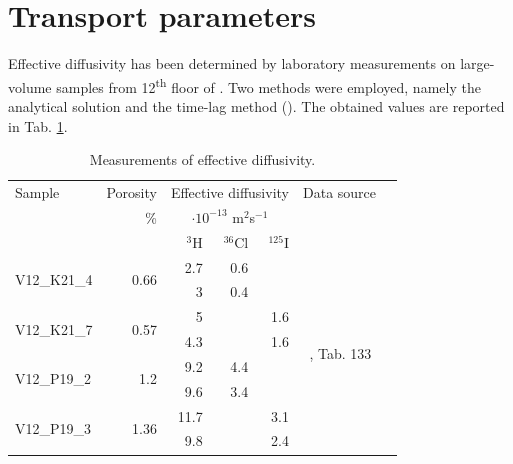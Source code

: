 \section{Transport parameters}
\label{sec:review_diffusion}
Effective diffusivity has been determined by laboratory measurements on large-volume samples from 12\textsuperscript{th} floor of \URFBI. Two methods were employed, namely the analytical solution and the time-lag method (\cite{tz_hh}).
The obtained values are reported in Tab. \ref{tab:diffusivity}.

\begin{table}[!htp]\centering
\caption{Measurements of effective diffusivity.}\label{tab:diffusivity}
\scriptsize
\begin{tabular}{lrrrrrr}\toprule
Sample &Porosity &\multicolumn{3}{c}{Effective diffusivity} &Data source \\
&\% &\multicolumn{3}{c}{$\cdot10^{-13}$ m${}^2$s${}^{-1}$} & \\\midrule
& &${}^3$H &${}^{36}$Cl &${}^{125}$I & \\
\midrule
\multirow{2}{*}{V12\_K21\_4} &\multirow{2}{*}{0.66} &2.7 &0.6 & &\multirow{8}{*}{\cite{tz_hh}, Tab. 133 $ $} \\
& &3 &0.4 & & \\\cmidrule{1-5}
\multirow{2}{*}{V12\_K21\_7} &\multirow{2}{*}{0.57} &5 & &1.6 & \\
& &4.3 & &1.6 & \\\cmidrule{1-5}
\multirow{2}{*}{V12\_P19\_2} &\multirow{2}{*}{1.2} &9.2 &4.4 & & \\
& &9.6 &3.4 & & \\\cmidrule{1-5}
\multirow{2}{*}{V12\_P19\_3} &\multirow{2}{*}{1.36} &11.7 & &3.1 & \\
& &9.8 & &2.4 & \\
\bottomrule
\end{tabular}
\end{table}








